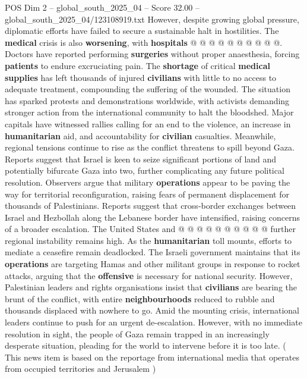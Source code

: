 \begin{textsample}{POS Dim 2 – global\_south\_2025\_04 – Score 32.00 – global\_south\_2025\_04/123108919.txt}
However, despite growing global pressure, diplomatic efforts have failed to secure a sustainable halt in hostilities.
The \textbf{medical} crisis is also \textbf{worsening}, with \textbf{hospitals} @ @ @ @ @ @ @ @ @ @.
Doctors have reported performing \textbf{surgeries} without proper anaesthesia, forcing \textbf{patients} to endure excruciating pain.
The \textbf{shortage} of critical \textbf{medical} \textbf{supplies} has left thousands of injured \textbf{civilians} with little to no access to adequate treatment, compounding the suffering of the wounded.
The situation has sparked protests and demonstrations worldwide, with activists demanding stronger action from the international community to halt the bloodshed.
Major capitals have witnessed rallies calling for an end to the violence, an increase in \textbf{humanitarian} aid, and accountability for \textbf{civilian} casualties.
Meanwhile, regional tensions continue to rise as the conflict threatens to spill beyond Gaza.
Reports suggest that Israel is keen to seize significant portions of land and potentially bifurcate Gaza into two, further complicating any future political resolution.
Observers argue that military \textbf{operations} appear to be paving the way for territorial reconfiguration, raising fears of permanent displacement for thousands of Palestinians.
Reports suggest that cross-border exchanges between Israel and Hezbollah along the Lebanese border have intensified, raising concerns of a broader escalation.
The United States and @ @ @ @ @ @ @ @ @ @ further regional instability remains high.
As the \textbf{humanitarian} toll mounts, efforts to mediate a ceasefire remain deadlocked.
The Israeli government maintains that its \textbf{operations} are targeting Hamas and other militant groups in response to rocket attacks, arguing that the \textbf{offensive} is necessary for national security.
However, Palestinian leaders and rights organisations insist that \textbf{civilians} are bearing the brunt of the conflict, with entire \textbf{neighbourhoods} reduced to rubble and thousands displaced with nowhere to go.
Amid the mounting crisis, international leaders continue to push for an urgent de-escalation.
However, with no immediate resolution in sight, the people of Gaza remain trapped in an increasingly desperate situation, pleading for the world to intervene before it is too late. ( This news item is based on the reportage from international media that operates from occupied territories and Jerusalem )

\end{textsample}
